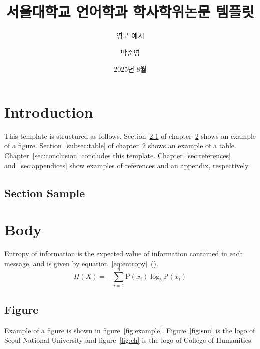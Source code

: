 \documentclass[en]{snu-ling-ba-thesis}
\title{서울대학교 언어학과 학사학위논문 템플릿}
\subtitle{영문 예시}
\author{박준영}
\affil{서울대학교 인문대학 언어학과}
\date{2025년 8월}
\begin{document}
\maketitle

\begin{abstract}
  \lipsum[1]
\end{abstract}


\tableofcontents


\section{Introduction}\label{sec:introduction}
This template is structured as follows.
Section~\ref{subsec:figure} of chapter~\ref{sec:body} shows an example of a figure.
Section~\ref{subsec:table} of chapter~\ref{sec:body} shows an example of a table.
Chapter~\ref{sec:conclusion} concludes this template.
Chapter~\ref{sec:references} and~\ref{sec:appendices} show examples of references and an appendix, respectively.


\subsection{Section Sample}\label{subsec:section}
\lipsum[2-3]


\section{Body}\label{sec:body}
Entropy of information is the expected value of information contained in each message, and is given by equation~\eqref{eq:entropy}~(\cite{sha48}).
\begin{equation}\label{eq:entropy}
  H(X) = -\sum_{i=1}^n {\mathrm{P}(x_i) \log_b \mathrm{P}(x_i)}
\end{equation}

\lipsum[4-6]


\subsection{Figure}\label{subsec:figure}
Example of a figure is shown in figure~\ref{fig:example}.
Figure~\ref{fig:snu} is the logo of Seoul National University and figure~\ref{fig:ch} is the logo of College of Humanities.
\end{document}
